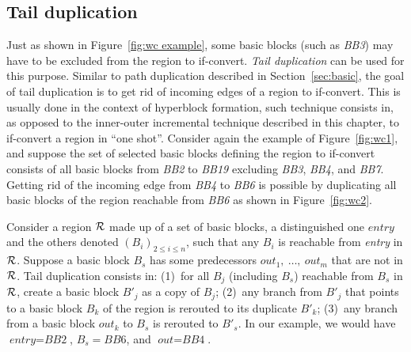 \subsection{Tail duplication}

Just as shown in Figure~\ref{fig:wc example}, some basic blocks (such as \textit{BB3}) may have to be excluded from the region to if-convert. 
\emph{Tail duplication}  can be used for this purpose. 
Similar to path duplication described in Section~\ref{sec:basic}, the goal of tail duplication is to get rid of incoming edges of a region to if-convert. 
This is usually done in the context of hyperblock formation, such technique consists in, as opposed to the inner-outer incremental technique described in this chapter, to if-convert a region in ``one shot''. 
Consider again the example of Figure~\ref{fig:wc1}, and suppose the set of selected basic blocks defining the region to if-convert consists of all basic blocks from \textit{BB2} to \textit{BB19} excluding \textit{BB3}, \textit{BB4}, and \textit{BB7}. 
Getting rid of the incoming edge from \textit{BB4} to \textit{BB6} is possible by duplicating all basic blocks of the region reachable from \textit{BB6} as shown in Figure~\ref{fig:wc2}.

Consider a region $\cal R$ made up of a set of basic blocks, a distinguished one $\textit{entry}$ and the others denoted $\left(B_i\right)_{2\leq i\leq n}$, such that any $B_i$ is reachable from \textit{entry} in $\cal R$. 
Suppose a basic block $B_s$ has some predecessors $\textit{out}_1,\ \dots,\ \textit{out}_m$ that are not in $\cal R$. 
Tail duplication consists in: 
(1)~for all $B_j$ (including $B_s$) reachable from $B_s$ in $\cal R$, create a basic block $B'_j$ as a copy of $B_j$; 
(2)~any branch from $B'_j$ that points to a basic block $B_k$ of the region is rerouted to its duplicate $B'_k$; 
(3)~any branch from a basic block $\textit{out}_k$ to $B_s$ is rerouted to $B'_s$. 
In our example, we would have $\textit{entry}=\textit{BB2}$, $B_s=\textit{BB6}$, and $\textit{out}=\textit{BB4}$.

